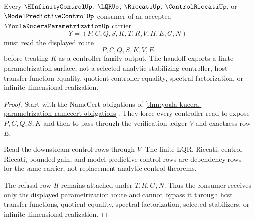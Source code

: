\begin{theorem}
\label{thm:youla-kucera-parametrization-robust-control-handoff}
Every $\HInfinityControlUp$, $\LQRUp$, $\RiccatiUp$, $\ControlRiccatiUp$, or $\ModelPredictiveControlUp$ consumer of an accepted $\YoulaKuceraParametrizationUp$ carrier
$$
Y=(P,C,Q,S,K,T,R,V,H,E,G,N)
$$
must read the displayed route
$$
P,C,Q,S,K,V,E
$$
before treating $K$ as a controller-family output. The handoff exports a finite parametrization surface, not a selected analytic stabilizing controller, host transfer-function equality, quotient controller equality, spectral factorization, or infinite-dimensional realization.
\end{theorem}
\begin{proof}
Start with the NameCert obligations of \autoref{thm:youla-kucera-parametrization-namecert-obligations}. They force every controller read to expose $P,C,Q,S,K$ and then to pass through the verification ledger $V$ and exactness row $E$.

Read the downstream control rows through $V$. The finite LQR, Riccati, control-Riccati, bounded-gain, and model-predictive-control rows are dependency rows for the same carrier, not replacement analytic control theorems.

The refusal row $H$ remains attached under $T,R,G,N$. Thus the consumer receives only the displayed parametrization route and cannot bypass it through host transfer functions, quotient equality, spectral factorization, selected stabilizers, or infinite-dimensional realization.
\end{proof}


\begin{closurestatus}{\YoulaKuceraParametrizationUp}
  \theoryclosure{\seedClosure}
  \formalstatus{\unformalizedV}
\end{closurestatus}
